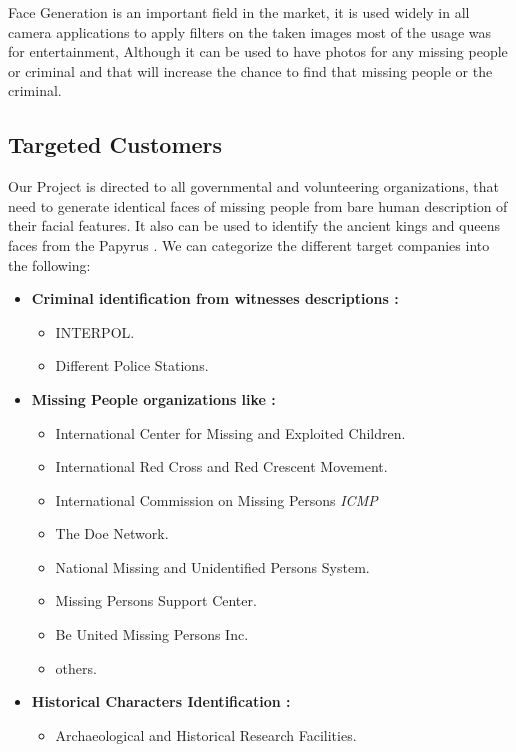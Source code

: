 
Face Generation is an important field in the market, it is used widely in all camera applications to apply filters on the taken images most of the usage was for entertainment, Although it can be used to have photos for any missing people or criminal and that will increase the chance to find that missing people or the criminal.
 
\subsection{Targeted Customers}
Our Project is directed to all governmental and volunteering organizations, that need to generate identical faces of missing people from bare human description of their facial features.
It also can be used to identify the ancient kings and queens faces from the Papyrus .
We can categorize the different target companies into the following:
\begin{itemize}
    \item \textbf{Criminal identification from witnesses descriptions :}
        \begin{itemize}
            \item INTERPOL.
            \item Different Police Stations.
        \end{itemize}
    \item \textbf{Missing People organizations like :}
        \begin{itemize}
            \item International Center for Missing and Exploited Children.
            \item International Red Cross and Red Crescent Movement.
            \item International Commission on Missing Persons \emph{ICMP}
            \item The Doe Network.
            \item National Missing and Unidentified Persons System.
            \item Missing Persons Support Center.
            \item Be United Missing Persons Inc.
            \item others.
        \end{itemize}
    \item \textbf{Historical Characters Identification :}
        \begin{itemize}
            \item Archaeological and Historical Research Facilities.
        \end{itemize}
\end{itemize}

